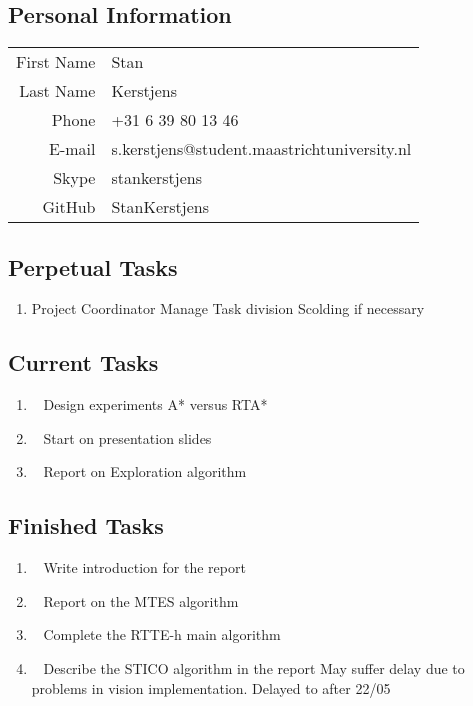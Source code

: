 \subsection{Personal Information}
\begin{table}[h!]
	\begin{tabular}{rl}
	First Name 	& Stan\\
	Last Name	& Kerstjens\\
	Phone		& +31 6 39 80 13 46\\
	E-mail		& s.kerstjens@student.maastrichtuniversity.nl\\
	Skype		& stankerstjens\\
	GitHub		& StanKerstjens
\end{tabular}
\end{table}

\subsection{Perpetual Tasks}
\begin{enumerate}
	\item Project Coordinator
		\subitem Manage Task division
		\subitem Scolding if necessary
\end{enumerate}

\subsection{Current Tasks}
\begin{enumerate}
	\item~
		Design experiments
		\subitem A* versus RTA*
	\item~
		Start on presentation slides
	\item~
		Report on Exploration algorithm
\end{enumerate}

\subsection{Finished Tasks}
\begin{enumerate}
	\item~\marginpar{}
		Write introduction for the report
	\item~
		Report on the MTES algorithm
	\item~
		Complete the RTTE-h main algorithm
	\item~
	Describe the STICO algorithm in the report
		\subitem May suffer delay due to problems in vision implementation.
		\subitem Delayed to after 22/05
\end{enumerate}